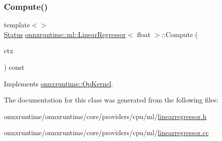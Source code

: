 \mbox{\label{classonnxruntime_1_1ml_1_1LinearRegressor_a2429a780f50ff633d29ff109b665eeda}} 
\subsubsection{\texorpdfstring{Compute()}{Compute()}\hspace{0.1cm}{\footnotesize\ttfamily [2/2]}}
{\footnotesize\ttfamily template$<$$>$ \\
\mbox{\hyperlink{classonnxruntime_1_1common_1_1Status}{Status}} \mbox{\hyperlink{classonnxruntime_1_1ml_1_1LinearRegressor}{onnxruntime\+::ml\+::\+Linear\+Regressor}}$<$ float $>$\+::Compute (\begin{DoxyParamCaption}\item[{\mbox{\hyperlink{classonnxruntime_1_1OpKernelContext}{Op\+Kernel\+Context}} $\ast$}]{ctx }\end{DoxyParamCaption}) const\hspace{0.3cm}{\ttfamily [virtual]}}



Implements \mbox{\hyperlink{classonnxruntime_1_1OpKernel_a9eca8656a78b1b3ab9d3351a12798650}{onnxruntime\+::\+Op\+Kernel}}.



The documentation for this class was generated from the following files\+:\begin{DoxyCompactItemize}
\item 
onnxruntime/onnxruntime/core/providers/cpu/ml/\mbox{\hyperlink{linearregressor_8h}{linearregressor.\+h}}\item 
onnxruntime/onnxruntime/core/providers/cpu/ml/\mbox{\hyperlink{linearregressor_8cc}{linearregressor.\+cc}}\end{DoxyCompactItemize}
